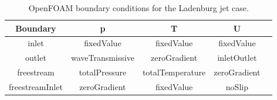 \documentclass[12pt]{article}
\begin{document}
\begin{table}[H]
  \centering
  \caption{OpenFOAM boundary conditions for the Ladenburg jet case.}
  \label{tab:OF_BC}
  \begin{tabular}{ccccc} 
  \hline
    Boundary & p & T & U \\
    \hline
    inlet & fixedValue & fixedValue & fixedValue \\
    outlet & waveTransmissive & zeroGradient & inletOutlet \\
    freestream & totalPressure & totalTemperature & zeroGradient \\
    freestreamInlet & zeroGradient & fixedValue & noSlip \\
    \hline
  \end{tabular}
\end{table}
\end{document}
